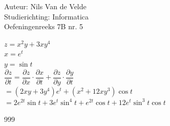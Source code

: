 \documentclass[a4paper]{article}
\begin{document}
  
\noindent \large Auteur: Nils Van de Velde \\
\noindent \large Studierichting: Informatica\\
\noindent \large Oefeningenreeks 7B nr. 5\\

\medskip

\normalsize

$z = x^2y+3xy^4$\\

$x=e^t$\\

$y=\sin t$\\

$\dfrac{\partial z}{\partial t} = \dfrac{\partial z}{\partial x}\cdot\dfrac{\partial x}{\partial t}+\dfrac{\partial z}{\partial y}\cdot\dfrac{\partial y}{\partial t}$\\

$=(2xy+3y^4)e^t+(x^2+12xy^3)\cos t$\\

$=2e^{2t}\sin t+3e^t\sin^4t+e^{2t}\cos t+12e^t\sin^3t\cos t$\\

\begin{thebibliography}{999}
\end{thebibliography}
\end{document}
